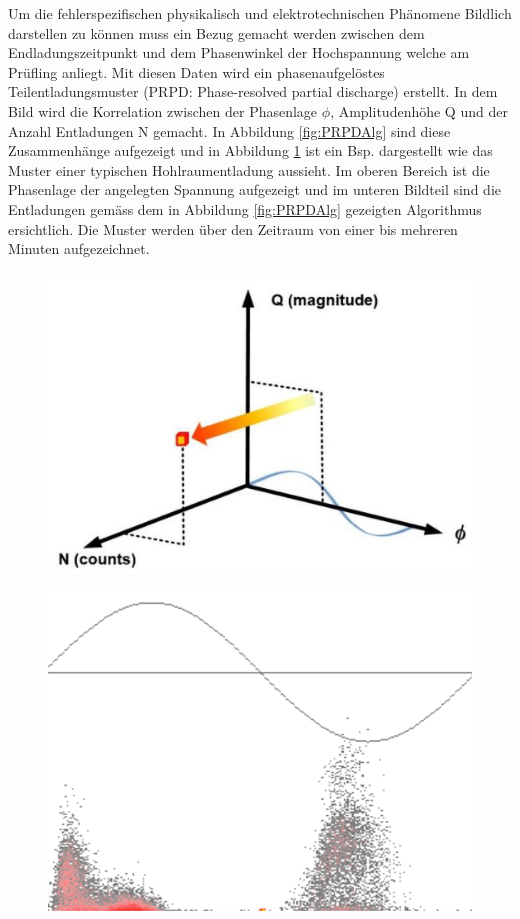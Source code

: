 \begin{refsection}
Um die fehlerspezifischen physikalisch und elektrotechnischen Phänomene Bildlich darstellen zu können muss ein Bezug gemacht werden zwischen dem Endladungszeitpunkt und dem Phasenwinkel der Hochspannung welche am Prüfling anliegt. 
Mit diesen Daten wird ein phasenaufgelöstes Teilentladungsmuster (PRPD: Phase-resolved partial discharge) erstellt. 
In dem Bild wird die Korrelation zwischen der Phasenlage $\phi$, Amplitudenhöhe Q und der Anzahl Entladungen N gemacht. \cite{buch:UHFSignale} 
In Abbildung \ref{fig:PRPDAlg} sind diese Zusammenhänge aufgezeigt und in Abbildung \ref{fig:PRPDHohl} 
ist ein Bsp. dargestellt wie das Muster einer typischen Hohlraumentladung aussieht. 
Im oberen Bereich ist die Phasenlage der angelegten Spannung aufgezeigt und im unteren Bildteil sind die Entladungen gemäss dem in Abbildung \ref{fig:PRPDAlg} gezeigten Algorithmus ersichtlich.
Die Muster werden über den Zeitraum von einer bis mehreren Minuten aufgezeichnet.
\begin{figure}[h]
	\centering
	\begin{minipage}{.5\textwidth}
		\centering
		\includegraphics[width=.6\linewidth]{papers/gis/Bilder/PERP}
		\label{fig:PRPDAlg}
	\end{minipage}%
	\begin{minipage}{.5\textwidth}
		\centering
		\includegraphics[width=.6\linewidth]{papers/gis/Bilder/OberflaechenentladungPRPD}
		\label{fig:PRPDHohl}
	\end{minipage}
\end{figure}



\end{refsection}
